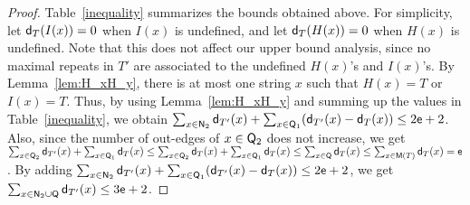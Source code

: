 \begin{proof}

  Table~\ref{inequality} summarizes the bounds obtained above.
  For simplicity,
  let $\mathsf{d}_T{(I(x))} = 0$ when $I(x)$ is undefined,
  and let $\mathsf{d}_T{(H(x))} = 0$ when $H(x)$ is undefined.
  Note that this does not affect our upper bound analysis,
  since no maximal repeats in $T'$ are associated to the undefined $H(x)$'s and $I(x)$'s.
  By Lemma~\ref{lem:H_xH_y}, there is at most one string $x$ such that $H(x) = T$ or $I(x) = T$.
  Thus, by using Lemma~\ref{lem:H_xH_y} and summing up the values in Table~\ref{inequality}, 
  we obtain $\sum_{x\in \mathsf{N}_{\mathrm{2}}}\mathsf{d}_{T'}(x) + \sum_{x\in \mathsf{Q}_{\mathrm{1}}}(\mathsf{d}_{T'}(x)-\mathsf{d}_T(x)) \le 2\mathsf{e}+2$.
  Also, since the number of out-edges of $x \in \mathsf{Q}_{\mathrm{2}}$ does not increase,
  we get
  $\sum_{x\in \mathsf{Q}_{\mathrm{2}}}\mathsf{d}_{T'}(x) + \sum_{x\in \mathsf{Q}_{\mathrm{1}}}\mathsf{d}_{T}(x) \le 
  \sum_{x\in \mathsf{Q}_{\mathrm{2}}}\mathsf{d}_{T}(x) + \sum_{x\in \mathsf{Q}_{\mathrm{1}}}\mathsf{d}_{T}(x) \le
  \sum_{x\in \mathsf{Q}}\mathsf{d}_{T}(x) \le \sum_{x\in \mathsf{M}(T)}\mathsf{d}_{T}(x) = \mathsf{e}$.
  By adding $\sum_{x\in \mathsf{N}_{\mathrm{2}}}\mathsf{d}_{T'}(x) + \sum_{x\in \mathsf{Q}_{\mathrm{1}}}(\mathsf{d}_{T'}(x)-\mathsf{d}_T(x)) \le 2\mathsf{e}+2$, 
  we get $\sum_{x \in \mathsf{N}_{\mathrm{2}} \cup \mathsf{Q}}\mathsf{d}_{T'}(x) \le 3\mathsf{e}+2$.
  \end{proof}
